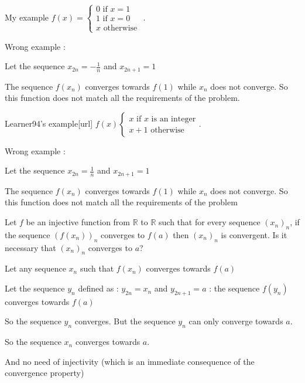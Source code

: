 \begin{solution}
	\begin{tcolorbox}My example $f(x)=\begin{cases}0\text{ if } x=1\\ 1\text{ if } x=0\\ x\text{ otherwise }\end{cases}$.
\end{tcolorbox}
Wrong example :

Let the sequence $x_{2n}=-\frac 1n$ and $x_{2n+1}=1$

The sequence $f(x_n)$ converges towards $f(1)$ while $x_n$ does not converge.  So this function does not match all the requirements of the problem.
\end{solution}



\begin{solution}
	\begin{tcolorbox}[url=http://www.artofproblemsolving.com/Forum\/memberlist.php?mode=viewprofile&u=107451]Learner94's example[\/url] $f(x)\begin{cases}x\text{ if } x\text{ is}\text{ an}\text{ integer}\\x+1\text{ otherwise }\end{cases}$.\end{tcolorbox}
Wrong example :

Let the sequence $x_{2n}=\frac 1n$ and $x_{2n+1}=1$

The sequence $f(x_n)$ converges towards $f(1)$ while $x_n$ does not converge.  So this function does not match all the requirements of the problem
\end{solution}



\begin{solution}
	\begin{tcolorbox}Let $f$ be an injective function from $\mathbb R$ to $\mathbb R$ such that for every sequence $(x_n)_n$, if  the sequence $(f(x_n))_n$ converges to $f(a)$ then $(x_n)_n$ is convergent.
Is it necessary that $(x_n)_n$ converges to $ a $?\end{tcolorbox}
Let any sequence $x_n$ such that $f(x_n)$ converges towards $f(a)$

Let the sequence $y_n$ defined as : $y_{2n}=x_n$ and $y_{2n+1}=a$ : the sequence $f(y_n)$ converges towards $f(a)$

So the sequence $y_n$ converges. But the sequence $y_n$ can only converge towards $a$.

So the sequence $x_n$ converges towards $a$.

And no need of injectivity (which is an immediate consequence of the convergence property)
\end{solution}



